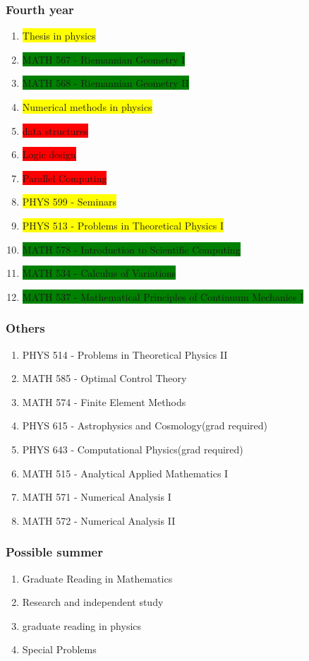 \subsubsection{Fourth year}
\begin{enumerate}
    \item \colorbox{yellow}{Thesis in physics}
    \item \colorbox{green}{MATH 567 - Riemannian Geometry I}
    \item \colorbox{green}{MATH 568 - Riemannian Geometry II}
    \item \colorbox{yellow}{Numerical methods in physics}
    \item \colorbox{red}{data structures}
    \item \colorbox{red}{Logic design}
    \item \colorbox{red}{Parallel Computing}
    \item \colorbox{yellow}{PHYS 599 - Seminars}
    \item \colorbox{yellow}{PHYS 513 - Problems in Theoretical Physics I}
    \item \colorbox{green}{MATH 578 - Introduction to Scientific Computing}
    \item \colorbox{green}{MATH 534 - Calculus of Variations}
    \item \colorbox{green}{MATH 537 - Mathematical Principles of Continuum Mechanics I}
    
\end{enumerate}
\subsubsection{Others}
\begin{enumerate}
    \item PHYS 514 - Problems in Theoretical Physics II
    \item MATH 585 - Optimal Control Theory
    \item MATH 574 - Finite Element Methods
    \item PHYS 615 - Astrophysics and Cosmology(grad required)
    \item PHYS 643 - Computational Physics(grad required)
    \item MATH 515 - Analytical Applied Mathematics I
    \item MATH 571 - Numerical Analysis I
    \item MATH 572 - Numerical Analysis II
    
\end{enumerate}
\subsubsection{Possible summer}
\begin{enumerate}
    \item Graduate Reading in Mathematics
    \item Research and independent study
    \item graduate reading in physics
    \item Special Problems
\end{enumerate}
